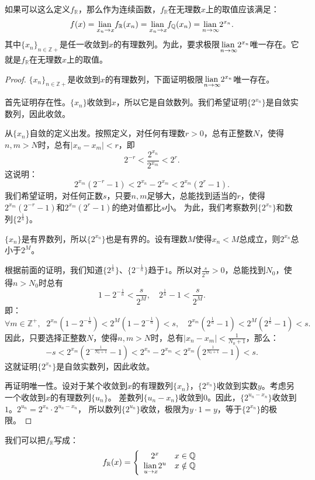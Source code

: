 \documentclass[12pt,UTF8,fontset=none]{ctexbook}
\begin{document}
如果可以这么定义$f_{\mathbb{R}}$，那么作为连续函数，$f_{\mathbb{R}}$在无理数$x$上的取值应该满足：
$$  f(x) = \underset{x_n \to x}{\operatorname{lian}\,}f_{\mathbb{R}}( x_n) = \underset{x_n \to x}{\operatorname{lian}\,}f_{\mathbb{Q}}(x_n) = \underset{n \to \infty}{\operatorname{lian}\,} 2^{x_n}. $$
其中$\{x_n\}_{n\in\mathbb{Z}+}$是任一收敛到$x$的有理数列。为此，要求极限$\underset{n \to \infty}{\operatorname{lian}\,} 2^{x_n}$唯一存在。它就是$f_{\mathbb{R}}$在无理数$x$上的取值。

\begin{proof}
    $\{x_n\}_{n\in\mathbb{Z}+}$是收敛到$x$的有理数列，下面证明极限$\underset{n \to \infty}{\operatorname{lian}\,} 2^{x_n}$唯一存在。

    首先证明存在性。$\{x_n\}$收敛到$x$，所以它是自敛数列。我们希望证明$\{2^{x_n}\}$是自敛实数列，因此收敛。

    从$\{x_n\}$自敛的定义出发。按照定义，对任何有理数$r>0$，总有正整数$N$，使得$n,m>N$时，总有$|x_n - x_m| < r$，即
    $$2^{-r} < \frac{2^{x_n}}{2^{x_m}} < 2^r.$$
    这说明：
    $$ 2^{x_m}(2^{-r} - 1) < 2^{x_n} - 2^{x_m} < 2^{x_m}(2^r - 1).$$
    我们希望证明，对任何正数$s$，只要$n,m$足够大，总能找到适当的$r$，使得$2^{x_m}(2^{-r} - 1)$和$2^{x_m}(2^r - 1)$的绝对值都比$s$小。
    为此，我们考察数列$\{2^{x_n}\}$和数列$\{2^{\frac{1}{n}}\}$。
    
    $\{x_n\}$是有界数列，所以$\{2^{x_n}\}$也是有界的。设有理数$M$使得$x_n < M$总成立，则$2^{x_n}$总小于$2^M$。
    
    根据前面的证明，我们知道$\{2^{\frac{1}{n}}\}$、$\{2^{-\frac{1}{n}}\}$趋于$1$。所以对$\frac{s}{2^M}>0$，总能找到$N_0$，使得$n>N_0$时总有
    $$ 1 - 2^{-\frac{1}{n}} < \frac{s}{2^M}, \quad 2^\frac{1}{n} - 1 < \frac{s}{2^M}. $$
    即：
    $$ \forall m\in\mathbb{Z}^+, \;\,\, 2^{x_m}(1 - 2^{-\frac{1}{n}}) < 2^M(1 - 2^{-\frac{1}{n}}) < s, \quad 2^{x_m}(2^\frac{1}{n} - 1) < 2^M(2^\frac{1}{n} - 1) < s. $$
    因此，只要选择正整数$N$，使得$n,m>N$时，总有$|x_n - x_m| < \frac{1}{N_0+1}$，那么：
    $$ -s < 2^{x_m}(2^{-\frac{1}{N_0+1}} - 1) < 2^{x_n} - 2^{x_m} < 2^{x_m}(2^\frac{1}{N_0+1} - 1) < s.$$
    这就证明$\{2^{x_n}\}$是自敛实数列，因此收敛。

    再证明唯一性。设对于某个收敛到$x$的有理数列$\{x_n\}$，$\{2^{x_n}\}$收敛到实数$y$。考虑另一个收敛到$x$的有理数列$\{u_n\}$。
    差数列$\{u_n - x_n\}$收敛到$0$。因此，$\{2^{u_n - x_n}\}$收敛到$1$。$2^{u_n} = 2^{x_n} \cdot 2^{u_n - x_n}$，
    所以数列$\{2^{u_n}\}$收敛，极限为$y \cdot 1 = y$，等于$\{2^{x_n}\}$的极限。
\end{proof}

我们可以把$f_{\mathbb{R}}$写成：
$$
    f_{\mathbb{R}} (x) = \left\{\begin{array}[]{cc}
        2^x & x\in\mathbb{Q} \\
        \lian{u \to x} 2^u & x \notin \mathbb{Q}
    \end{array}\right.
$$
\end{document}
